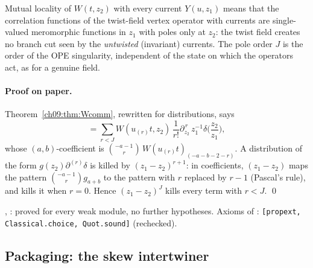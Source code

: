 \begin{physics}
Mutual locality of $W(t,z_2)$ with every current $Y(u,z_1)$ means that the correlation functions of the twist-field vertex operator with currents are single-valued meromorphic functions in $z_1$ with poles only at $z_2$: the twist field creates no branch cut seen by the \emph{untwisted} (invariant) currents. The pole order $J$ is the order of the OPE singularity, independent of the state on which the operators act, as for a genuine field.
\end{physics}

\paragraph{Proof on paper.} Theorem~\ref{ch09:thm:Wcomm}, rewritten for distributions, says
\begin{equation*}
[Y_M(u,z_1),W(t,z_2)]=\sum_{r<J}W(u_{(r)}t,z_2)\,\frac{1}{r!}\partial_{z_2}^{\,r}\,z_1^{-1}\delta\Big(\frac{z_2}{z_1}\Big),
\end{equation*}
whose $(a,b)$-coefficient is $\binom{-a-1}{r}\,W(u_{(r)}t)_{(-a-b-2-r)}$. A distribution of the
form $g(z_2)\partial^{(r)}\delta$ is killed by $(z_1-z_2)^{r+1}$: in coefficients,
$(z_1-z_2)$ maps the pattern $\binom{-a-1}{r}g_{a+b}$ to the pattern with $r$ replaced by $r-1$
(Pascal's rule), and kills it when $r=0$. Hence $(z_1-z_2)^J$ kills every term with $r<J$. \qed

\begin{status}
, : proved for every weak module, no further hypotheses.
Axioms of : \texttt{[propext, Classical.choice, Quot.sound]} (rechecked).
\end{status}

\subsection{Packaging: the skew intertwiner}

